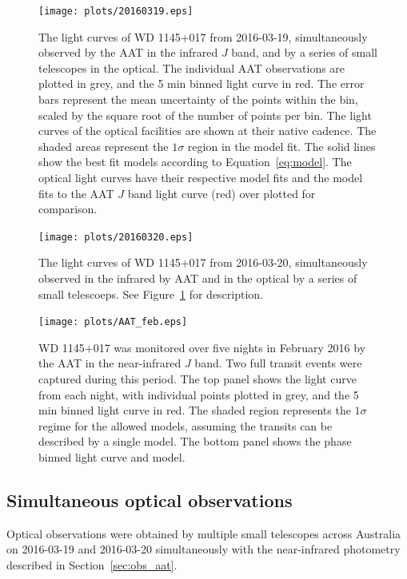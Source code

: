 \documentclass[iop,useAMES,usenatbig]{emulateapj}
\begin{document}
\begin{figure}
    \centering
    \texttt{[image: plots/20160319.eps]}
    \caption{The light curves of WD 1145+017 from 2016-03-19, simultaneously observed by the AAT in the infrared $J$ band, and by a series of small telescopes in the optical. The individual AAT observations are plotted in grey, and the 5 min binned light curve in red. The error bars represent the mean uncertainty of the points within the bin, scaled by the square root of the number of points per bin. The light curves of the optical facilities are shown at their native cadence. The shaded areas represent the $1\sigma$ region in the model fit. The solid lines show the best fit models according to Equation~\ref{eq:model}. The optical light curves have their respective model fits and the model fits to the AAT $J$ band light curve (red) over plotted for comparison.}
    \label{fig:lc_20160319}
\end{figure}

\begin{figure}
    \centering
    \texttt{[image: plots/20160320.eps]}
    \caption{The light curves of WD 1145+017 from 2016-03-20, simultaneously observed in the infrared by AAT and in the optical by a series of small telescoeps. See Figure~\ref{fig:lc_20160319} for description.}
    \label{fig:lc_20160320}
\end{figure}


\begin{figure}
    \centering
    \texttt{[image: plots/AAT\_feb.eps]}
    \caption{WD 1145+017 was monitored over five nights in February 2016 by the AAT in the near-infrared $J$ band. Two full transit events were captured during this period. The top panel shows the light curve from each night, with individual points plotted in grey, and the 5 min binned light curve in red. The shaded region represents the $1\sigma$ regime for the allowed models, assuming the transits can be described by a single model. The bottom panel shows the phase binned light curve and model.}
    \label{fig:lc_201602}
\end{figure}


\subsection{Simultaneous optical observations}
\label{sec:simultaneous-optical}

Optical observations were obtained by multiple small telescopes across Australia on 2016-03-19 and 2016-03-20 simultaneously with the near-infrared photometry described in Section~\ref{sec:obs_aat}. 
\end{document}
